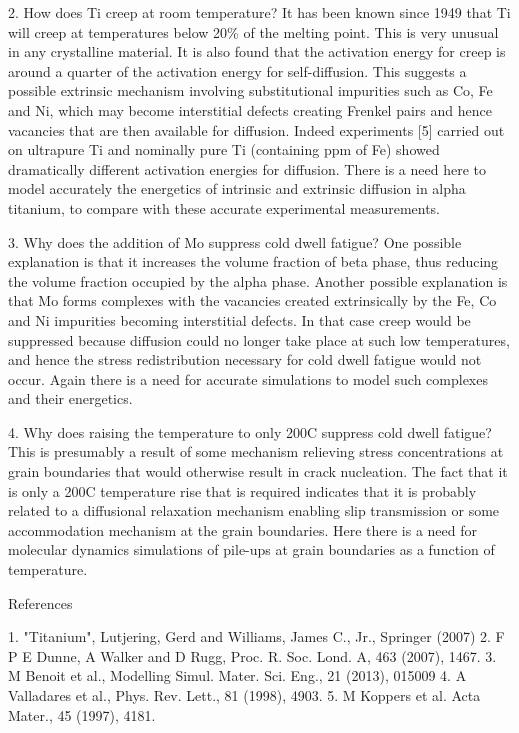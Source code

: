 2. How does Ti creep at room temperature? It has been known since 1949 that Ti will creep at temperatures below 20\% of the melting point. This is very unusual in any crystalline material. It is also found that the activation energy for creep is around a quarter of the activation energy for self-diffusion. This suggests a possible extrinsic mechanism involving substitutional impurities such as Co, Fe and Ni, which may become interstitial defects creating Frenkel pairs and hence vacancies that are then available for diffusion. Indeed experiments [5] carried out on ultrapure Ti and nominally pure Ti (containing ppm of Fe) showed dramatically different activation energies for diffusion. There is a need here to model accurately the energetics of intrinsic and extrinsic diffusion in alpha titanium, to compare with these accurate experimental measurements.

3. Why does the addition of Mo suppress cold dwell fatigue? One possible explanation is that it increases the volume fraction of beta phase, thus reducing the volume fraction occupied by the alpha phase. Another possible explanation is that Mo forms complexes with the vacancies created extrinsically by the Fe, Co and Ni impurities becoming interstitial defects. In that case creep would be suppressed because diffusion could no longer take place at such low temperatures, and hence the stress redistribution necessary for cold dwell fatigue would not occur. Again there is a need for accurate simulations to model such complexes and their energetics.

4. Why does raising the temperature to only 200C suppress cold dwell fatigue? This is presumably a result of some mechanism relieving stress concentrations at grain boundaries that would otherwise result in crack nucleation. The fact that it is only a 200C temperature rise that is required indicates that it is probably related to a diffusional relaxation mechanism enabling slip transmission or some accommodation mechanism at the grain boundaries. Here there is a need for molecular dynamics simulations of pile-ups at grain boundaries as a function of temperature.

References

1. "Titanium", Lutjering, Gerd and Williams, James C., Jr., Springer (2007)
2. F P E Dunne, A Walker and D Rugg, Proc. R. Soc. Lond. A, 463 (2007), 1467.
3. M Benoit et al., Modelling Simul. Mater. Sci. Eng., 21 (2013), 015009
4. A Valladares et al., Phys. Rev. Lett., 81 (1998), 4903.
5. M Koppers et al. Acta Mater., 45 (1997), 4181.
